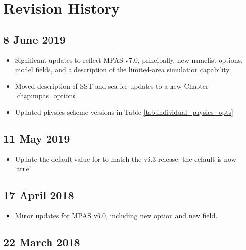 
\chapter{Revision History}

\section*{8 June 2019}

\begin{itemize}
\item Significant updates to reflect MPAS v7.0, principally, new namelist options, model fields, and a description of the
limited-area simulation capability
\item Moved description of SST and sea-ice updates to a new Chapter \ref{chap:mpas_options}
\item Updated physics scheme versions in Table \ref{tab:individual_physics_opts}
\end{itemize}

\section*{11 May 2019}

\begin{itemize}
\item Update the default value for  to match the v6.3 release: the default is now `true'.
\end{itemize}

\section*{17 April 2018}

\begin{itemize}
\item Minor updates for MPAS v6.0, including new  option and new  field.
\end{itemize}

\section*{22 March 2018}

